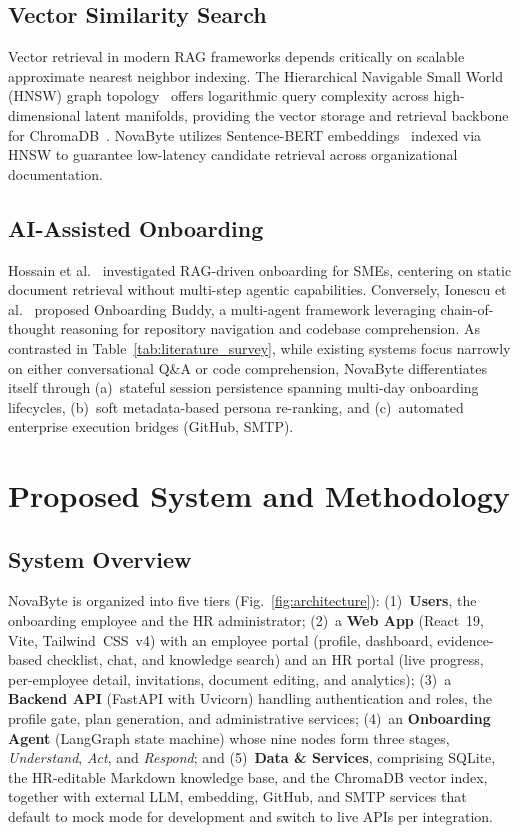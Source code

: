 \documentclass[conference]{IEEEtran}
\begin{document}
\subsection{Vector Similarity Search}
Vector retrieval in modern RAG frameworks depends critically on scalable approximate nearest neighbor indexing. The Hierarchical Navigable Small World (HNSW) graph topology~\cite{malkov2020hnsw} offers logarithmic query complexity across high-dimensional latent manifolds, providing the vector storage and retrieval backbone for ChromaDB~\cite{chromadb2024}. NovaByte utilizes Sentence-BERT embeddings~\cite{reimers2019sentence} indexed via HNSW to guarantee low-latency candidate retrieval across organizational documentation.

\subsection{AI-Assisted Onboarding}
Hossain et al.~\cite{hossain2024perfect} investigated RAG-driven onboarding for SMEs, centering on static document retrieval without multi-step agentic capabilities. Conversely, Ionescu et al.~\cite{ionescu2025multi} proposed Onboarding Buddy, a multi-agent framework leveraging chain-of-thought reasoning for repository navigation and codebase comprehension. As contrasted in Table~\ref{tab:literature_survey}, while existing systems focus narrowly on either conversational Q\&A or code comprehension, NovaByte differentiates itself through (a)~stateful session persistence spanning multi-day onboarding lifecycles, (b)~soft metadata-based persona re-ranking, and (c)~automated enterprise execution bridges (GitHub, SMTP).

\section{Proposed System and Methodology}

\subsection{System Overview}
NovaByte is organized into five tiers (Fig.~\ref{fig:architecture}): (1)~\textbf{Users}, the onboarding employee and the HR administrator; (2)~a \textbf{Web App} (React~19, Vite, Tailwind~CSS~v4) with an employee portal (profile, dashboard, evidence-based checklist, chat, and knowledge search) and an HR portal (live progress, per-employee detail, invitations, document editing, and analytics); (3)~a \textbf{Backend API} (FastAPI with Uvicorn) handling authentication and roles, the profile gate, plan generation, and administrative services; (4)~an \textbf{Onboarding Agent} (LangGraph state machine) whose nine nodes form three stages, \emph{Understand}, \emph{Act}, and \emph{Respond}; and (5)~\textbf{Data \& Services}, comprising SQLite, the HR-editable Markdown knowledge base, and the ChromaDB vector index, together with external LLM, embedding, GitHub, and SMTP services that default to mock mode for development and switch to live APIs per integration.
\end{document}
